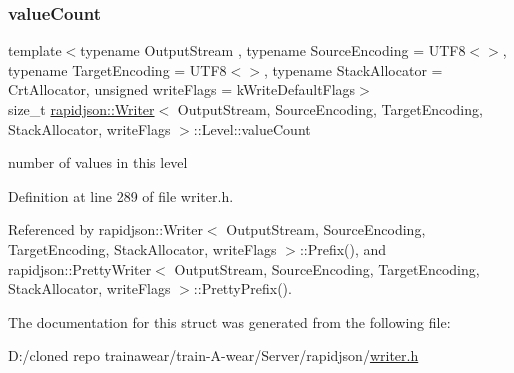 \mbox{\label{structrapidjson_1_1_writer_1_1_level_a5d17bdfa9ded5de72f5f91175cc3e36b}} 
\subsubsection{\texorpdfstring{valueCount}{valueCount}}
{\footnotesize\ttfamily template$<$typename Output\+Stream , typename Source\+Encoding  = U\+T\+F8$<$$>$, typename Target\+Encoding  = U\+T\+F8$<$$>$, typename Stack\+Allocator  = Crt\+Allocator, unsigned write\+Flags = k\+Write\+Default\+Flags$>$ \\
size\+\_\+t \mbox{\hyperlink{classrapidjson_1_1_writer}{rapidjson\+::\+Writer}}$<$ Output\+Stream, Source\+Encoding, Target\+Encoding, Stack\+Allocator, write\+Flags $>$\+::Level\+::value\+Count}



number of values in this level 



Definition at line 289 of file writer.\+h.



Referenced by rapidjson\+::\+Writer$<$ Output\+Stream, Source\+Encoding, Target\+Encoding, Stack\+Allocator, write\+Flags $>$\+::\+Prefix(), and rapidjson\+::\+Pretty\+Writer$<$ Output\+Stream, Source\+Encoding, Target\+Encoding, Stack\+Allocator, write\+Flags $>$\+::\+Pretty\+Prefix().



The documentation for this struct was generated from the following file\+:\begin{DoxyCompactItemize}
\item 
D\+:/cloned repo trainawear/train-\/\+A-\/wear/\+Server/rapidjson/\mbox{\hyperlink{writer_8h}{writer.\+h}}\end{DoxyCompactItemize}
